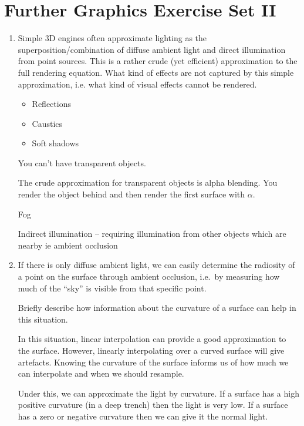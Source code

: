 \documentclass[10pt,\jkfside,a4paper]{article}
\begin{document}
\section{Further Graphics Exercise Set II}

\begin{enumerate}

\item Simple 3D engines often approximate lighting as the
superposition/combination of diffuse ambient light and direct illumination
from point sources. This is a rather crude (yet efficient) approximation to
the full rendering equation. What kind of effects are not captured by this
simple approximation, i.e. what kind of visual effects cannot be rendered.

\begin{itemize}

\item Reflections

\item Caustics

\item Soft shadows

\end{itemize}

{\color{blue}
You can't have transparent objects.

The crude approximation for transparent objects is alpha blending. You
render the object behind and then render the first surface with $\alpha$.

Fog

Indirect illumination -- requiring illumination from other objects which are
nearby ie ambient occlusion
}

\item If there is only diffuse ambient light, we can easily determine the
radiosity of a point on the surface through ambient occlusion, i.e.\ by
measuring how much of the ``sky'' is visible from that specific point.

Briefly describe how information about the curvature of a surface can help
in this situation.

In this situation, linear interpolation can provide a good approximation to
the surface. However, linearly interpolating over a curved surface will give
artefacts. Knowing the curvature of the surface informs us of how much we
can interpolate and when we should resample.

{
\color{blue}
Under this, we can approximate the light by curvature. If a surface has a
high positive curvature (in a deep trench) then the light is very low.
If a surface has a zero or negative curvature then we can give it the normal
light.

}
\end{enumerate}
\end{document}
